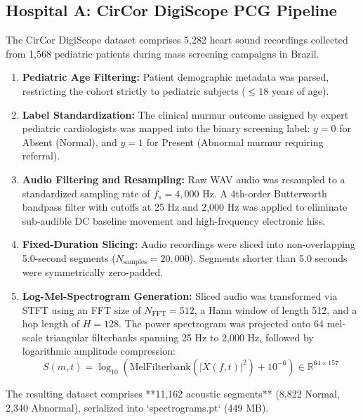 \documentclass[12pt,a4paper]{amritareport}
\begin{document}
\subsection{Hospital A: CirCor DigiScope PCG Pipeline}
The CirCor DigiScope dataset \cite{oliveira2022circor} comprises 5,282 heart sound recordings collected from 1,568 pediatric patients during mass screening campaigns in Brazil.
\begin{enumerate}
	\item \textbf{Pediatric Age Filtering:} Patient demographic metadata was parsed, restricting the cohort strictly to pediatric subjects ($\leq 18$ years of age).
	\item \textbf{Label Standardization:} The clinical murmur outcome assigned by expert pediatric cardiologists was mapped into the binary screening label: $y = 0$ for Absent (Normal), and $y = 1$ for Present (Abnormal murmur requiring referral).
	\item \textbf{Audio Filtering and Resampling:} Raw WAV audio was resampled to a standardized sampling rate of $f_s = 4,000\text{ Hz}$. A 4th-order Butterworth bandpass filter with cutoffs at 25 Hz and 2,000 Hz was applied to eliminate sub-audible DC baseline movement and high-frequency electronic hiss.
	\item \textbf{Fixed-Duration Slicing:} Audio recordings were sliced into non-overlapping 5.0-second segments ($N_{\text{samples}} = 20,000$). Segments shorter than 5.0 seconds were symmetrically zero-padded.
	\item \textbf{Log-Mel-Spectrogram Generation:} Sliced audio was transformed via STFT using an FFT size of $N_{\text{FFT}} = 512$, a Hann window of length 512, and a hop length of $H = 128$. The power spectrogram was projected onto 64 mel-scale triangular filterbanks spanning 25 Hz to 2,000 Hz, followed by logarithmic amplitude compression:
	\begin{equation}
		S(m, t) = \log_{10}\left(\text{MelFilterbank}(|X(f, t)|^2) + 10^{-6}\right) \in \mathbb{R}^{64 \times 157}
	\end{equation}
\end{enumerate}
The resulting dataset comprises **11,162 acoustic segments** (8,822 Normal, 2,340 Abnormal), serialized into `spectrograms.pt` (449 MB).
\end{document}
